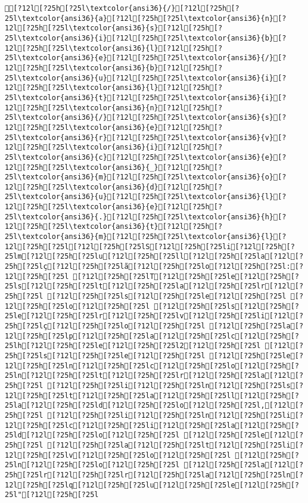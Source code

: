 \documentclass{scrartcl}
\begin{document}
\begin{Verbatim}
[?12l[?25h[?25l\textcolor{ansi36}{/}[?12l[?25h[?25l\textcolor{ansi36}{a}[?12l[?25h[?25l\textcolor{ansi36}{n}[?12l[?25h[?25l\textcolor{ansi36}{s}[?12l[?25h[?25l\textcolor{ansi36}{i}[?12l[?25h[?25l\textcolor{ansi36}{b}[?12l[?25h[?25l\textcolor{ansi36}{l}[?12l[?25h[?25l\textcolor{ansi36}{e}[?12l[?25h[?25l\textcolor{ansi36}{/}[?12l[?25h[?25l\textcolor{ansi36}{b}[?12l[?25h[?25l\textcolor{ansi36}{u}[?12l[?25h[?25l\textcolor{ansi36}{i}[?12l[?25h[?25l\textcolor{ansi36}{l}[?12l[?25h[?25l\textcolor{ansi36}{t}[?12l[?25h[?25l\textcolor{ansi36}{i}[?12l[?25h[?25l\textcolor{ansi36}{n}[?12l[?25h[?25l\textcolor{ansi36}{/}[?12l[?25h[?25l\textcolor{ansi36}{s}[?12l[?25h[?25l\textcolor{ansi36}{e}[?12l[?25h[?25l\textcolor{ansi36}{r}[?12l[?25h[?25l\textcolor{ansi36}{v}[?12l[?25h[?25l\textcolor{ansi36}{i}[?12l[?25h[?25l\textcolor{ansi36}{c}[?12l[?25h[?25l\textcolor{ansi36}{e}[?12l[?25h[?25l\textcolor{ansi36}{_}[?12l[?25h[?25l\textcolor{ansi36}{m}[?12l[?25h[?25l\textcolor{ansi36}{o}[?12l[?25h[?25l\textcolor{ansi36}{d}[?12l[?25h[?25l\textcolor{ansi36}{u}[?12l[?25h[?25l\textcolor{ansi36}{l}[?12l[?25h[?25l\textcolor{ansi36}{e}[?12l[?25h[?25l\textcolor{ansi36}{.}[?12l[?25h[?25l\textcolor{ansi36}{h}[?12l[?25h[?25l\textcolor{ansi36}{t}[?12l[?25h[?25l\textcolor{ansi36}{m}[?12l[?25h[?25l\textcolor{ansi36}{l}[?12l[?25h[?25l[?12l[?25h[?25lS[?12l[?25h[?25li[?12l[?25h[?25lm[?12l[?25h[?25lu[?12l[?25h[?25ll[?12l[?25h[?25la[?12l[?25h[?25lç[?12l[?25h[?25lã[?12l[?25h[?25lo[?12l[?25h[?25l:[?12l[?25h[?25l [?12l[?25h[?25lT[?12l[?25h[?25le[?12l[?25h[?25ls[?12l[?25h[?25lt[?12l[?25h[?25la[?12l[?25h[?25lr[?12l[?25h[?25l [?12l[?25h[?25ls[?12l[?25h[?25le[?12l[?25h[?25l [?12l[?25h[?25lo[?12l[?25h[?25l [?12l[?25h[?25ls[?12l[?25h[?25le[?12l[?25h[?25lr[?12l[?25h[?25lv[?12l[?25h[?25li[?12l[?25h[?25lç[?12l[?25h[?25lo[?12l[?25h[?25l [?12l[?25h[?25la[?12l[?25h[?25lp[?12l[?25h[?25la[?12l[?25h[?25lc[?12l[?25h[?25lh[?12l[?25h[?25le[?12l[?25h[?25l2[?12l[?25h[?25l [?12l[?25h[?25ls[?12l[?25h[?25le[?12l[?25h[?25l [?12l[?25h[?25le[?12l[?25h[?25ln[?12l[?25h[?25lc[?12l[?25h[?25lo[?12l[?25h[?25ln[?12l[?25h[?25lt[?12l[?25h[?25lr[?12l[?25h[?25la[?12l[?25h[?25l [?12l[?25h[?25li[?12l[?25h[?25ln[?12l[?25h[?25ls[?12l[?25h[?25lt[?12l[?25h[?25la[?12l[?25h[?25ll[?12l[?25h[?25la[?12l[?25h[?25ld[?12l[?25h[?25lo[?12l[?25h[?25l,[?12l[?25h[?25l [?12l[?25h[?25li[?12l[?25h[?25ln[?12l[?25h[?25li[?12l[?25h[?25lc[?12l[?25h[?25li[?12l[?25h[?25la[?12l[?25h[?25ld[?12l[?25h[?25lo[?12l[?25h[?25l [?12l[?25h[?25le[?12l[?25h[?25l [?12l[?25h[?25la[?12l[?25h[?25lt[?12l[?25h[?25li[?12l[?25h[?25lv[?12l[?25h[?25lo[?12l[?25h[?25l [?12l[?25h[?25ln[?12l[?25h[?25lo[?12l[?25h[?25l [?12l[?25h[?25la[?12l[?25h[?25lr[?12l[?25h[?25lr[?12l[?25h[?25la[?12l[?25h[?25ln[?12l[?25h[?25lq[?12l[?25h[?25lu[?12l[?25h[?25le[?12l[?25h[?25l"[?12l[?25h[?25l

\end{Verbatim}
\end{document}
